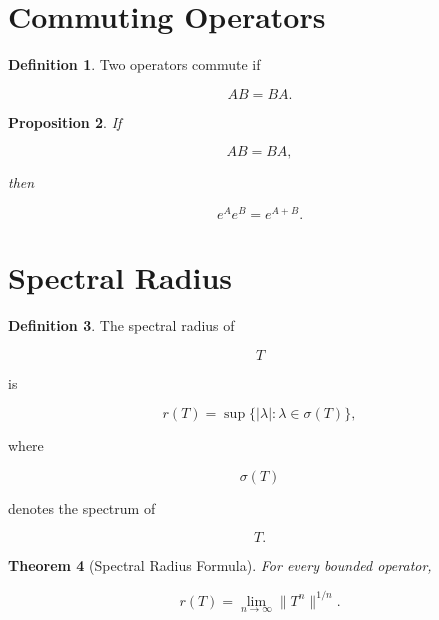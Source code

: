 \documentclass[11pt]{book}
\numberwithin{equation}{chapter}
\theoremstyle{definition}
\newtheorem{definition}{Definition}[chapter]
\theoremstyle{plain}
\newtheorem{theorem}[definition]{Theorem}
\newtheorem{proposition}[definition]{Proposition}
\begin{document}

\section{Commuting Operators}

\begin{definition}

Two operators commute if

\[
AB
=
BA.
\]

\end{definition}


\begin{proposition}

If

\[
AB=BA,
\]

then

\[
e^Ae^B
=
e^{A+B}.
\]

\end{proposition}


\section{Spectral Radius}

\begin{definition}

The spectral radius of

\[
T
\]

is

\[
r(T)
=
\sup
\{
|\lambda|
:
\lambda
\in
\sigma(T)
\},
\]

where

\[
\sigma(T)
\]

denotes the spectrum of

\[
T.
\]

\end{definition}


\begin{theorem}[Spectral Radius Formula]

For every bounded operator,

\[
r(T)
=
\lim_{n\rightarrow\infty}
\|T^n\|^{1/n}.
\]

\end{theorem}
\end{document}
